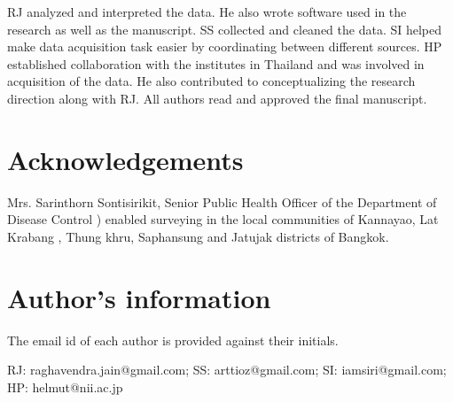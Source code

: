 \documentclass{bmcart}
\begin{document}
\begin{backmatter}
RJ analyzed and interpreted the data. He also wrote software used in the research as well as the manuscript. SS collected and cleaned the data. SI helped make data acquisition task easier by coordinating between different sources. HP established collaboration with the institutes in Thailand and was involved in acquisition of the data. He also contributed to conceptualizing the research direction along with RJ. All authors read and approved the final manuscript. 
    
      
\section*{Acknowledgements}
Mrs. Sarinthorn Sontisirikit, Senior Public Health Officer of the Department of Disease Control ) enabled surveying in the local communities of Kannayao, Lat Krabang , Thung khru, Saphansung and Jatujak districts of Bangkok.

\section*{Author's information}

The email id of each author is provided against their initials.

RJ: raghavendra.jain@gmail.com;
SS: arttioz@gmail.com; 
SI: iamsiri@gmail.com;
HP: helmut@nii.ac.jp
  

\clearpage

%





\end{backmatter}
\end{document}
